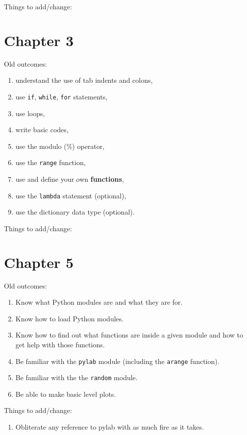 \noindent Things to add/change:

\section*{Chapter 3}

\noindent Old outcomes:
\begin{enumerate}
\item understand the use of tab indents and colons,
\item use {\tt if}, {\tt while}, {\tt for} statements,
\item use loops,
\item write basic codes,
\item use the modulo (\%) operator,
\item use the {\tt range} function,
\item use and define your own {\bf functions},
\item use the {\tt lambda} statement (optional),
\item use the dictionary data type (optional).
\end{enumerate}

\noindent Things to add/change:

\section*{Chapter 5}

\noindent Old outcomes:
\begin{enumerate}
\item Know what Python modules are and what they are for. 
\item Know how to load Python modules.
\item Know how to find out what functions are inside a given module and how to get help with those functions.
\item Be familiar with the {\tt pylab} module (including the {\tt arange} function).
\item Be familiar with the the {\tt random} module.
\item Be able to make basic level plots.
\end{enumerate}

\noindent Things to add/change:
\begin{enumerate}
    \item Obliterate any reference to pylab with as much fire as it takes.
\end{enumerate}

